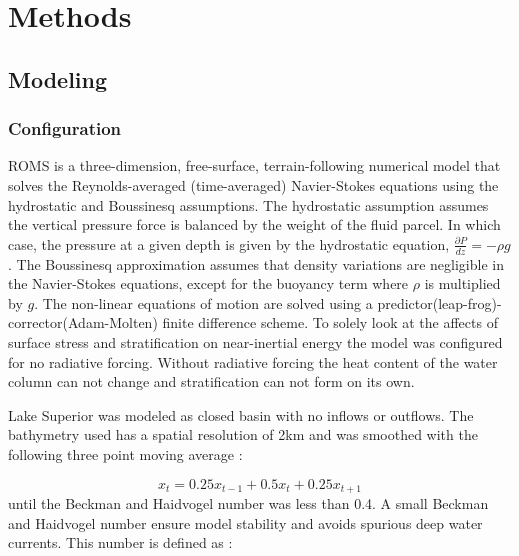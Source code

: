\chapter{Methods}
\label{experiment_chapter}

\section{Modeling }
\subsection{Configuration}
ROMS is a three-dimension, free-surface, terrain-following numerical model that solves the Reynolds-averaged (time-averaged) Navier-Stokes equations using the hydrostatic 
and Boussinesq assumptions. The hydrostatic assumption assumes the vertical pressure force is balanced by the weight of the fluid parcel. In which case, the pressure at a given  
depth is given by the hydrostatic equation, $\frac{\partial P}{dz}=-\rho g$. The Boussinesq approximation assumes that density variations are negligible in the Navier-Stokes 
equations, except for the buoyancy term where $\rho$ is multiplied by $g$.  The non-linear equations of motion are solved using  a predictor(leap-frog)-corrector(Adam-Molten) 
finite difference scheme. To solely look at the affects of surface stress and stratification on near-inertial energy the
model was configured for no radiative forcing. Without radiative forcing the heat content of the water column can not change and stratification can not form on its own.  

Lake Superior was modeled as closed basin with no inflows or outflows. The bathymetry used has a spatial resolution of 2km \citep{schwab1996computerized} and was
smoothed with the following three point moving average : 

\begin{equation}
	x_t = 0.25 x_{t-1} + 0.5 x_t + 0.25 x_{t+1} 
\end{equation}
until the Beckman and Haidvogel number  was less than 0.4. A small Beckman and Haidvogel number ensure model stability and avoids spurious deep water currents. 
This number is defined as : 


